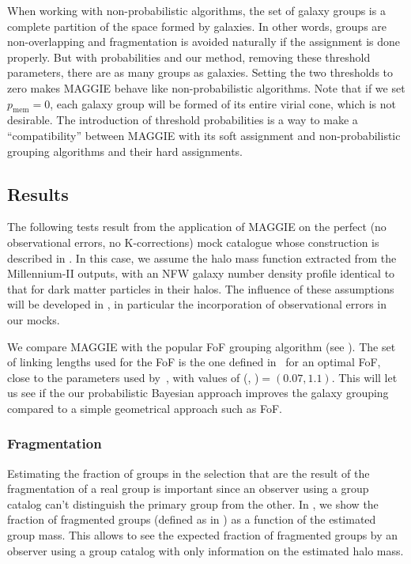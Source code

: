 When working with non-probabilistic algorithms, the set of galaxy groups is a
complete partition of the space formed by galaxies. In other words, groups are
non-overlapping and fragmentation is avoided naturally if the assignment is
done properly. But with probabilities and our method, removing these threshold
parameters, there are as many groups as galaxies. Setting the two thresholds to
zero makes MAGGIE behave like non-probabilistic algorithms. Note that if we set
$p_\mathrm{mem}=0$, each galaxy group will be formed of its entire virial cone,
which is not desirable. The introduction of threshold probabilities is a way to
make a ``compatibility'' between MAGGIE with its soft assignment and
non-probabilistic grouping algorithms and their hard assignments.

\subsection{Results}

The following tests result from the application of MAGGIE on the perfect (no
observational errors, no K-corrections) mock catalogue whose construction is
described in . In this case, we assume the halo mass
function extracted from the Millennium-II outputs, with an NFW galaxy number
density profile identical to that for dark matter particles in their halos. The
influence of these assumptions will be developed in
, in particular the incorporation of
observational errors in our mocks.

We compare MAGGIE with the popular FoF grouping algorithm (see
). The set of linking lengths used
for the FoF is the one defined in~\cite{Duarte+14} for an optimal FoF, close to
the parameters used by~\cite{Robotham+11}, with values of (\bperp,
\bpar)$=(0.07, 1.1)$. This will let us see if the our probabilistic Bayesian
approach improves the galaxy grouping compared to a simple geometrical approach
such as FoF.

\subsubsection{Fragmentation}

Estimating the fraction of groups in the selection that are the result of the
fragmentation of a real group is important since an observer using a group
catalog can't distinguish the primary group from the other. In
, we show the fraction of fragmented groups (defined
as in ) as a function of the
estimated group mass. This allows to see the expected fraction of fragmented
groups by an observer using a group catalog with only information on the
estimated halo mass.

